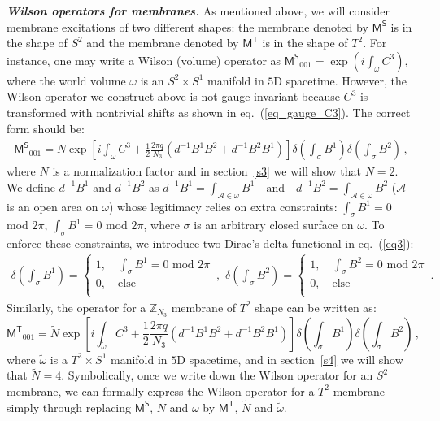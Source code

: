 \documentclass[11pt,nofootinbib,preprint]{revtex4-1}
\begin{document}
\textbf{\textit{Wilson operators for membranes.}}
As mentioned above, we will consider   membrane excitations of two different shapes: the membrane denoted by $\mathsf{M^S}$ is in the shape of $S^2$ and the membrane denoted by $\mathsf{M^T}$ is in the shape of $T^2$. For instance, one may write a Wilson (volume) operator as $
	\mathsf{M^S}_{001}=\exp \left( i\int_{\omega}{C^3} \right)$,  where the world volume $\omega$ is an $S^2\times S^1$ manifold in $5$D spacetime. However, the Wilson operator we construct above is not gauge invariant because $C^3$ is transformed with nontrivial shifts as shown in eq.~(\ref{eq_gauge_C3}). The correct form should be:
\begin{align}
	\mathsf{M^S}_{001}=N\exp \left[ i\int_{\omega}{C^3+\frac{1}{2}\frac{2\pi q}{N_3}\left( d^{-1}B^1B^2+d^{-1}B^2B^1 \right)} \right] \delta \left( \int_{\sigma}{B^1} \right) \delta \left( \int_{\sigma}{B^2} \right) \,,
	\label{eq3}
\end{align}
where $N$ is a normalization factor and in section~\ref{s3} we will show that $N=2$. We define $d^{-1}B^1$ and $d^{-1}B^2$ as
$	d^{-1}B^1=\int_{\mathcal{A} \in \omega}{B^1} \quad\text{and}\quad d^{-1}B^2=\int_{\mathcal{A} \in \omega}{B^2}
 $ ($\mathcal{A}$ is an open area on $\omega$) whose legitimacy relies on  extra constraints:  $\int_{\sigma}{B^1}=0$ mod $2\pi$, $\int_{\sigma}{B^1}=0$ mod $2\pi$, where $\sigma$ is an arbitrary closed surface on $\omega$. To enforce these constraints, we introduce two Dirac's delta-functional in eq.~(\ref{eq3}):
\begin{align}
	\delta \left( \int_{\sigma}{B^1} \right) =\begin{cases}
		1, \quad \int_{\sigma}{B^1}=0   \,\, \mathrm{mod}\,\, 2\pi\\
		0, \quad \mathrm{else}\\
	\end{cases}\,,\,\,
	\delta \left( \int_{\sigma}{B^2} \right) =\begin{cases}
		1, \quad \int_{\sigma}{B^2}=0 \,\,  \mathrm{mod} \,\, 2\pi\\
		0, \quad \mathrm{else}\\
	\end{cases}\,.
\end{align}
Similarly, the operator for  a $\mathbb{Z} _{N_3}$ membrane of $T^2$ shape can be written as:
\begin{equation}
	\mathsf{M^T}_{001}=\tilde{N}\exp \left[ i\int_{\tilde{\omega}}{C^3+\frac{1}{2}\frac{2\pi q}{N_3}\left( d^{-1}B^1B^2+d^{-1}B^2B^1 \right)} \right] \delta \left( \int_{\sigma}{B^1} \right) \delta \left( \int_{\sigma}{B^2} \right) \,,
\end{equation}
where $\tilde{\omega}$ is a $T^2\times S^1$ manifold in $5$D spacetime, and in section~\ref{s4} we will show that  $\tilde{N}=4$. Symbolically, once we write down the Wilson operator for an $S^2$ membrane, we can formally express  the Wilson operator for a $T^2$ membrane  simply through replacing $\mathsf{M^S}$, $N$ and $\omega$ by $\mathsf{M^T}$, $\tilde{N}$ and $\tilde{\omega}$. 
\end{document}
